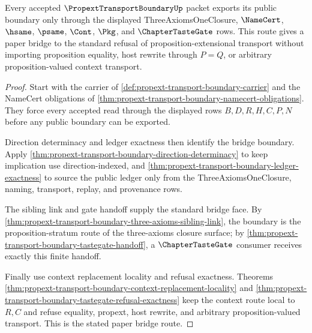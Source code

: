 \begin{theorem}
\label{thm:propext-transport-boundary-std-bridge}
Every accepted $\PropextTransportBoundaryUp$ packet exports its public boundary only through the displayed ThreeAxiomsOneClosure, $\NameCert$, $\hsame$, $\psame$, $\Cont$, $\Pkg$, and $\ChapterTasteGate$ rows. This route gives a paper bridge to the standard refusal of proposition-extensional transport without importing proposition equality, host rewrite through $P=Q$, or arbitrary proposition-valued context transport.
\end{theorem}
\begin{proof}
Start with the carrier of \autoref{def:propext-transport-boundary-carrier} and the NameCert obligations of \autoref{thm:propext-transport-boundary-namecert-obligations}. They force every accepted read through the displayed rows $B,D,R,H,C,P,N$ before any public boundary can be exported.

Direction determinacy and ledger exactness then identify the bridge boundary. Apply \autoref{thm:propext-transport-boundary-direction-determinacy} to keep implication use direction-indexed, and \autoref{thm:propext-transport-boundary-ledger-exactness} to source the public ledger only from the ThreeAxiomsOneClosure, naming, transport, replay, and provenance rows.

The sibling link and gate handoff supply the standard bridge face. By \autoref{thm:propext-transport-boundary-three-axioms-sibling-link}, the boundary is the proposition-stratum route of the three-axioms closure surface; by \autoref{thm:propext-transport-boundary-tastegate-handoff}, a $\ChapterTasteGate$ consumer receives exactly this finite handoff.

Finally use context replacement locality and refusal exactness. Theorems \autoref{thm:propext-transport-boundary-context-replacement-locality} and \autoref{thm:propext-transport-boundary-tastegate-refusal-exactness} keep the context route local to $R,C$ and refuse equality, propext, host rewrite, and arbitrary proposition-valued transport. This is the stated paper bridge route.
\end{proof}


